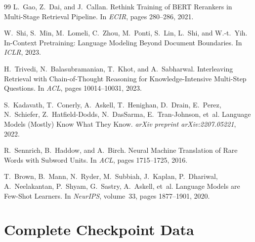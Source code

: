 \documentclass[11pt,a4paper]{article}
\theoremstyle{plain}
\theoremstyle{definition}
\begin{document}
\begin{thebibliography}{99}
L.~Gao, Z.~Dai, and J.~Callan.
\newblock Rethink Training of BERT Rerankers in Multi-Stage Retrieval Pipeline.
\newblock In \emph{ECIR}, pages 280--286, 2021.

W.~Shi, S.~Min, M.~Lomeli, C.~Zhou, M.~Ponti, S.~Lin, L.~Shi, and W.-t.~Yih.
\newblock In-Context Pretraining: Language Modeling Beyond Document Boundaries.
\newblock In \emph{ICLR}, 2023.

H.~Trivedi, N.~Balasubramanian, T.~Khot, and A.~Sabharwal.
\newblock Interleaving Retrieval with Chain-of-Thought Reasoning for Knowledge-Intensive Multi-Step Questions.
\newblock In \emph{ACL}, pages 10014--10031, 2023.

S.~Kadavath, T.~Conerly, A.~Askell, T.~Henighan, D.~Drain, E.~Perez, 
N.~Schiefer, Z.~Hatfield-Dodds, N.~DasSarma, E.~Tran-Johnson, et~al.
\newblock Language Models (Mostly) Know What They Know.
\newblock \emph{arXiv preprint arXiv:2207.05221}, 2022.

R.~Sennrich, B.~Haddow, and A.~Birch.
\newblock Neural Machine Translation of Rare Words with Subword Units.
\newblock In \emph{ACL}, pages 1715--1725, 2016.

T.~Brown, B.~Mann, N.~Ryder, M.~Subbiah, J.~Kaplan, P.~Dhariwal, 
A.~Neelakantan, P.~Shyam, G.~Sastry, A.~Askell, et~al.
\newblock Language Models are Few-Shot Learners.
\newblock In \emph{NeurIPS}, volume~33, pages 1877--1901, 2020.

\end{thebibliography}

\appendix

\section{Complete Checkpoint Data}
\label{app:checkpoints}
\end{document}
